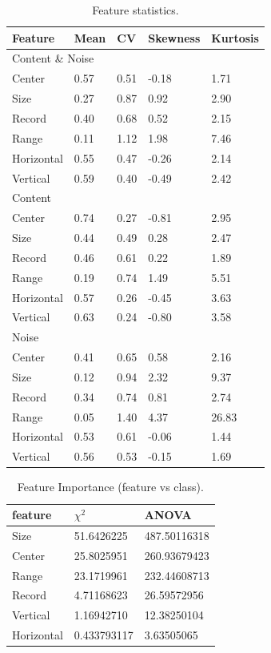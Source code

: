 \begin{table}[h]
\centering
\caption{Feature statistics.}
\label{tab:stat}
\begin{tabular}{ | l | l | l | l | l |}
\hline
Feature & Mean & CV & Skewness & Kurtosis \\
\hline
\multicolumn{5}{|l|}{Content \& Noise} \\
\hline
Center & 0.57 & 0.51 & -0.18 & 1.71 \\
Size & 0.27 & 0.87 & 0.92 & 2.90 \\
Record & 0.40 & 0.68 & 0.52 & 2.15 \\
Range & 0.11 & 1.12 & 1.98 & 7.46 \\
Horizontal & 0.55 & 0.47 & -0.26 & 2.14 \\
Vertical & 0.59 & 0.40 & -0.49 & 2.42 \\
\hline
\multicolumn{5}{|l|}{Content} \\
\hline
Center & 0.74 & 0.27 & -0.81 & 2.95 \\
Size & 0.44 & 0.49 & 0.28 & 2.47 \\
Record & 0.46 & 0.61 & 0.22 & 1.89 \\
Range & 0.19 & 0.74 & 1.49 & 5.51 \\
Horizontal & 0.57 & 0.26 & -0.45 & 3.63 \\
Vertical & 0.63 & 0.24 & -0.80 & 3.58 \\
\hline
\multicolumn{5}{|l|}{Noise} \\
\hline
Center & 0.41 & 0.65 & 0.58 & 2.16 \\
Size & 0.12 & 0.94 & 2.32 & 9.37 \\
Record & 0.34 & 0.74 & 0.81 & 2.74 \\
Range & 0.05 & 1.40 & 4.37 & 26.83 \\
Horizontal & 0.53 & 0.61 & -0.06 & 1.44 \\
Vertical & 0.56 & 0.53 & -0.15 & 1.69 \\
\hline
\end{tabular}
\end{table}

\begin{table}[h]
\centering
\caption{Feature Importance (feature vs class).}
\label{tab:importance}
\begin{tabular}{| l | l | l |}
\hline
feature & $\chi^2$ & ANOVA \\
\hline
Size       & 51.6426225  & 487.50116318 \\
Center     & 25.8025951  & 260.93679423 \\
Range      & 23.1719961  & 232.44608713 \\
Record     & 4.71168623  & 26.59572956 \\
Vertical   & 1.16942710  & 12.38250104 \\
Horizontal & 0.433793117 & 3.63505065 \\
\hline
\end{tabular}
\end{table}
         

